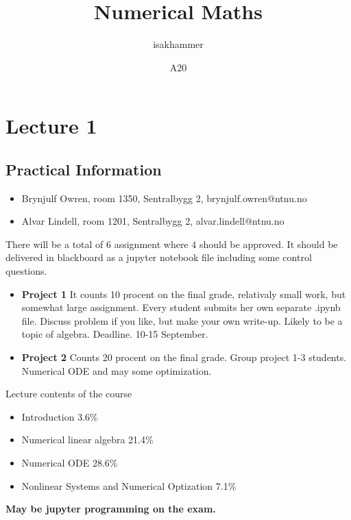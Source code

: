 \documentclass{article}
\title{Numerical Maths}
\author{isakhammer }
\date{A20}
\theoremstyle{remark}
\begin{document}
\maketitle
\tableofcontents
\newpage

\newpage
\section{Lecture 1}%
\label{sec:lecture_1}

\subsection{Practical Information}%
\label{sub:practical_information}

\begin{itemize}
  \item Brynjulf Owren, room 1350, Sentralbygg 2, brynjulf.owren@ntnu.no
  \item Alvar Lindell, room 1201, Sentralbygg 2, alvar.lindell@ntnu.no
\end{itemize}

There will be a total of 6 assignment where 4 should be approved. It should be delivered in blackboard as a jupyter notebook file including some control questions.   


\begin{itemize}
  \item \textbf{Project 1} It counts 10 procent on the final grade, relativaly small work, but somewhat large assignment. Every student submits her own separate .ipynb file. Discuss problem if you like, but make your own write-up. Likely to be a topic of algebra. Deadline. 10-15 September.
  \item \textbf{Project 2} Counts 20 procent on the final grade. Group project 1-3 students. Numerical ODE and may some optimization. 
\end{itemize}


\par
Lecture contents of the course
\begin{itemize}
  \item Introduction 3.6\%
  \item Numerical linear algebra 21.4\%
  \item Numerical ODE 28.6\%
  \item Nonlinear Systems and Numerical Optization 7.1\%
\end{itemize}

\textbf{May be jupyter programming on the exam.}  
\end{document}
